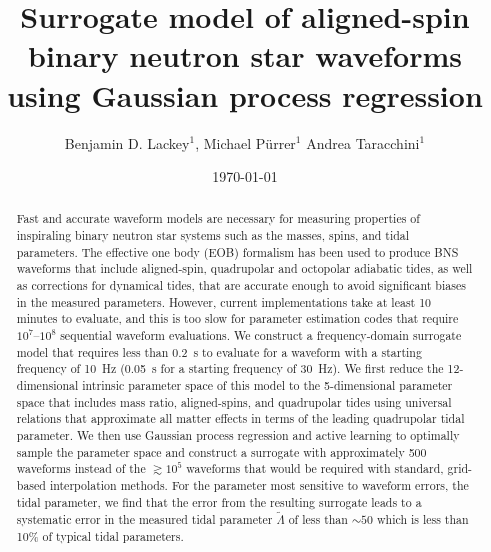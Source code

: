 \documentclass[prd,aps,letter,twocolumn,floatfix,notitlepage,nofootinbib]{revtex4-1}
\begin{document}
\title{Surrogate model of aligned-spin binary neutron star waveforms using Gaussian process regression}

\author{
Benjamin D. Lackey$^1$, 
Michael P\"{u}rrer$^1$
Andrea Taracchini$^1$
}

\date{\today}

\begin{abstract}

Fast and accurate waveform models are necessary for measuring properties of inspiraling binary neutron star systems such as the masses, spins, and tidal parameters. The effective one body (EOB) formalism has been used to produce BNS waveforms that include aligned-spin, quadrupolar and octopolar adiabatic tides, as well as corrections for dynamical tides, that are accurate enough to avoid significant biases in the measured parameters. However, current implementations take at least 10 minutes to evaluate, and this is too slow for parameter estimation codes that require $10^7$--$10^8$ sequential waveform evaluations. We construct a frequency-domain surrogate model that requires less than 0.2~s to evaluate for a waveform with a starting frequency of 10~Hz (0.05~s for a starting frequency of 30~Hz). We first reduce the 12-dimensional intrinsic parameter space of this model to the 5-dimensional parameter space that includes mass ratio, aligned-spins, and quadrupolar tides using universal relations that approximate all matter effects in terms of the leading quadrupolar tidal parameter. We then use Gaussian process regression and active learning to optimally sample the parameter space and construct a surrogate with approximately 500 waveforms instead of the $\gtrsim 10^5$ waveforms that would be required with standard, grid-based interpolation methods. For the parameter most sensitive to waveform errors, the tidal parameter, we find that the error from the resulting surrogate leads to a systematic error in the measured tidal parameter $\tilde\Lambda$ of less than $\sim 50$ which is less than 10\% of typical tidal parameters.



\end{abstract}

\end{document}
